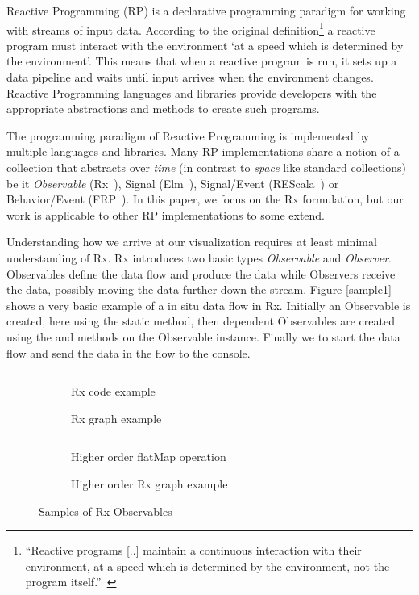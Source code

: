 \label{nutshell}
Reactive Programming (RP) is a declarative programming paradigm for working with streams of input data. 
According to the original definition\footnote{
``Reactive programs [..] maintain a continuous interaction with their environment, at a speed which is determined by the environment, not the program itself.''~\cite{berry1989real}
} a reactive program must interact with the environment `at a speed which is determined by the environment'.
This means that when a reactive program is run, it sets up a data pipeline and waits until input arrives when the environment changes.
Reactive Programming languages and libraries provide developers with the appropriate abstractions and methods to create such programs.

The programming paradigm of Reactive Programming is implemented by multiple languages and libraries. Many RP implementations share a notion of a collection that abstracts over \textit{time} (in contrast to \textit{space} like standard collections) be it \textit{Observable} (Rx~\cite{meijer2010subject}), Signal (Elm~\cite{czaplicki2012elm}), Signal/Event (REScala~\cite{salvaneschi2014rescala}) or Behavior/Event (FRP~\cite{elliott1997functional}). In this paper, we focus on the Rx formulation, but our work is applicable to other RP implementations to some extend. 

Understanding how we arrive at our visualization requires at least minimal understanding of Rx.
Rx introduces two basic types \textit{Observable} and \textit{Observer}. Observables define the data flow and produce the data while Observers receive the data, possibly moving the data further down the stream. Figure \ref{sample1} shows a very basic example of a in situ data flow in Rx. Initially an Observable is created, here using the static  method, then dependent Observables are created using the  and  methods on the Observable instance. Finally we  to start the data flow and send the data in the flow to the console.

\begin{figure*}[h!]
\centering

\begin{subfigure}[t]{\columnwidth}
	\inputminted[tabsize=2]{javascript}{listings/sample1.js}	
	\par\bigskip
	\caption{Rx code example}
	\label{sample1}
	\par\medskip
	
	\caption{Rx graph example}
	\label{chaincreate}
\end{subfigure}
\begin{subfigure}[t]{\columnwidth}
	\inputminted[tabsize=2]{javascript}{listings/sample3.js}	
	\caption{Higher order flatMap operation}
	\label{sample3}
	\par\medskip
	
	\caption{Higher order Rx graph example}
	\label{chainhigher}
\end{subfigure}

\caption{Samples of Rx Observables}

\end{figure*}

